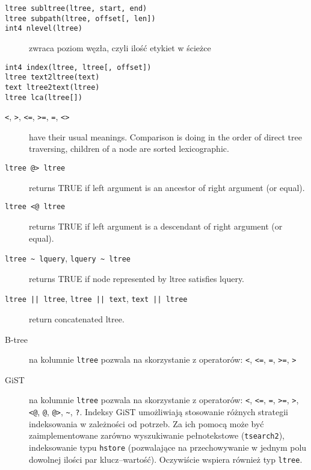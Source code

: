 \begin{description}
    \item[\texttt{ltree subltree(ltree, start, end)}] 
    \item[\texttt{ltree subpath(ltree, offset[, len])}] 
    \item[\texttt{int4 nlevel(ltree)}] 
        zwraca poziom węzła, czyli ilość etykiet w ścieżce
    \item[\texttt{int4 index(ltree, ltree[, offset])}] 
    \item[\texttt{ltree text2ltree(text)}] 
    \item[\texttt{text ltree2text(ltree)}] 
    \item[\texttt{ltree lca(ltree[])}] 
\end{description}

\begin{description}
    \item[\texttt{<}, \texttt{>}, \texttt{<=}, \texttt{>=}, \texttt{=}, \texttt{<>}]
        have their usual meanings. Comparison is doing in the order of direct tree traversing, children of a node are sorted lexicographic.
    \item[\texttt{ltree @> ltree}]
        returns TRUE if left argument is an ancestor of right argument (or equal).
    \item[\texttt{ltree <@ ltree}]
        returns TRUE if left argument is a descendant of right argument (or equal).
    \item[\texttt{ltree \~{} lquery}, \texttt{lquery \~{} ltree}]
        returns TRUE if node represented by ltree satisfies lquery.
    \item[\texttt{ltree || ltree}, \texttt{ltree || text}, \texttt{text || ltree}]
        return concatenated ltree.
\end{description}



\begin{description}
    \item[B-tree] na kolumnie \texttt{ltree} pozwala na skorzystanie z operatorów: \verb|<|, \verb|<=|, \verb|=|, \verb|>=|, \verb|>|
    \item[GiST] na kolumnie \texttt{ltree} pozwala na skorzystanie z operatorów: 
        \verb|<|, \verb|<=|, \verb|=|, \verb|>=|, \verb|>|, \verb|<@|, \verb|@|, \verb|@>|, \verb|~|, \verb|?|.
        Indeksy GiST  umożliwiają stosowanie różnych strategii indeksowania w zależności od potrzeb.
        Za ich pomocą może być zaimplementowane zarówno wyszukiwanie pełnotekstowe (\texttt{tsearch2}), 
        indeksowanie typu \texttt{hstore} (pozwalające na przechowywanie w jednym polu dowolnej ilości par klucz--wartość).
        Oczywiście wspiera również typ \texttt{ltree}.
\end{description}

